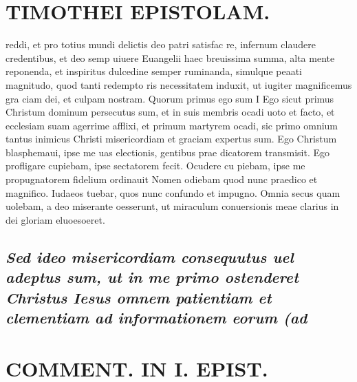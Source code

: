 \documentclass{article}
\begin{document}
\begin{pages}
\section*{TIMOTHEI EPISTOLAM. }
\marginpar{[ p.33 ]}\pstart reddi, et pro totius mundi delictis deo patri satisfac re, infernum claudere credentibus, et deo semp uiuere Euangelii haec breuissima summa, alta mente reponenda, et inspiritus dulcedine semper ruminanda, simulque peaati magnitudo, quod tanti redempto ris necessitatem induxit, ut iugiter magnificemus gra ciam dei, et culpam nostram.  \pend\pstart Quorum primus ego sum I Ego sicut primus Christum dominum persecutus sum, et in suis membris ocadi uoto et facto, et ecclesiam suam agerrime afflixi, et primum martyrem ocadi, sic primo omnium tantus inimicus Christi misericordiam et graciam expertus sum. Ego Christum blasphemaui, ipse me uas electionis, gentibus prae dicatorem transmisit. Ego profligare cupiebam, ipse sectatorem fecit. Ocudere cu piebam, ipse me propugnatorem fidelium ordinauit Nomen odiebam quod nunc praedico et magnifico. Iudaeos tuebar, quos nunc confundo et impugno. Omnia secus quam uolebam, a deo miserante oesserunt, ut miraculum conuersionis meae clarius in dei gloriam eluoesoeret.  \pend
{}
{}
\subsection*{\textit{Sed ideo misericordiam consequutus uel adeptus sum, ut in me primo ostenderet Christus Iesus omnem patientiam et clementiam ad informationem eorum (ad }}
\section*{COMMENT. IN I. EPIST. }
\marginpar{[ p.34 ]}
{}

\end{pages}
\end{document}
